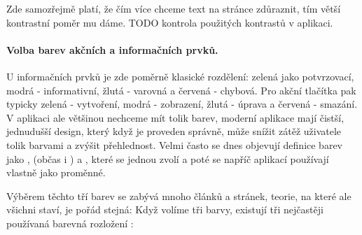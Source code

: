 Zde samozřejmě platí, že čím více chceme text na stránce zdůraznit, tím větší kontrastní poměr mu dáme. TODO kontrola použitých kontrastů v aplikaci.

\paragraph{Volba barev akčních a informačních prvků.} U informačních prvků je zde poměrně klasické rozdělení: zelená jako potvrzovací, modrá - informativní, žlutá - varovná a červená - chybová. Pro akční tlačítka pak typicky zelená - vytvoření, modrá - zobrazení, žlutá - úprava a červená - smazání. V aplikaci ale většinou nechceme mít tolik barev, moderní aplikace mají čistší, jednudušší design, který když je proveden správně, může snížit zátěž uživatele tolik barvami a zvýšit přehlednost. Velmi často se dnes objevují definice barev jako ,  (občas i ) a , které se jednou zvolí a poté se napříč aplikací používají vlastně jako proměnné.

Výběrem těchto tří barev se zabývá mnoho článků a stránek, teorie, na které ale všichni staví, je pořád stejná: Když volíme tři barvy, existují tři nejčastěji používaná barevná rozložení \cite{color-scheme-pick}:

